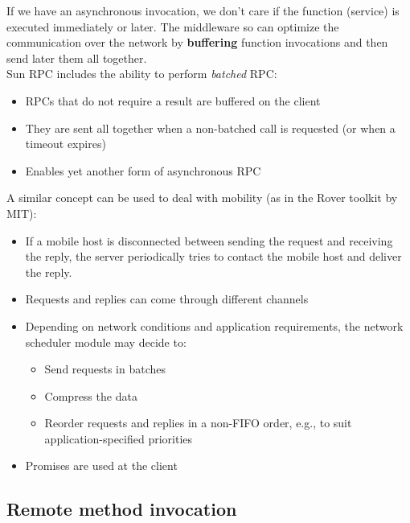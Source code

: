 \documentclass[10pt,a4paper]{article}
\begin{document}
If we have an asynchronous invocation, we don't care if the function (service) is executed immediately or later. The middleware so can optimize the communication over the network by \textbf{buffering} function invocations and then send later them all together. \\
Sun RPC includes the ability to perform \textit{batched} RPC:
\begin{itemize}
	\item RPCs that do not require a result are buffered on the client
	\item They are sent all together when a non-batched call is requested (or when a timeout expires)
	\item Enables yet another form of asynchronous RPC
\end{itemize}
A similar concept can be used to deal with mobility (as in the Rover toolkit by MIT):
\begin{itemize}
	\item If a mobile host is disconnected between sending the request and receiving the reply, the server periodically tries to contact the mobile host and deliver the reply.
	\item Requests and replies can come through different channels
	\item Depending on network conditions and application requirements, the network scheduler module may decide to:
	\begin{itemize}
		\item Send requests in batches
		\item Compress the data
		\item Reorder requests and replies in a non-FIFO order, e.g., to suit application-specified priorities
	\end{itemize}
	\item Promises are used at the client
\end{itemize}
\subsection{Remote method invocation}
\end{document}

